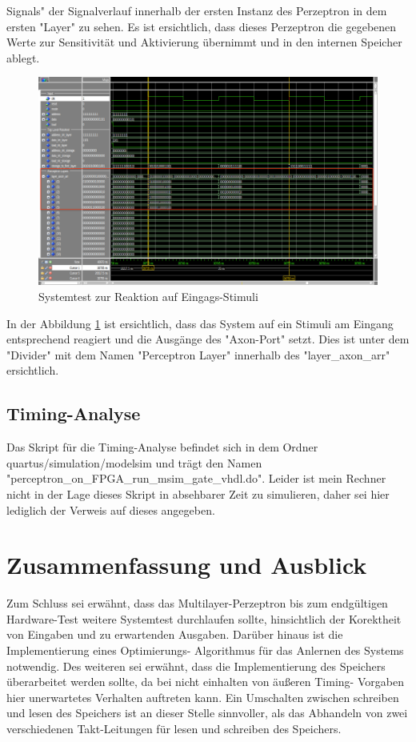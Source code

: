 \documentclass{article}
\numberwithin{equation}{section}
\begin{document}
Signals" der Signalverlauf innerhalb der ersten Instanz des Perzeptron in dem ersten 
"Layer" zu sehen. Es ist ersichtlich, dass dieses Perzeptron die gegebenen Werte 
zur Sensitivität und Aktivierung übernimmt und in den internen Speicher ablegt.
\begin{figure}[htb!]
    \begin{center}
      \includegraphics[width=15cm]{SimulationPictures/top_level_entity_stimulus_sim.png}
    \end{center}
    \caption{Systemtest zur Reaktion auf Eingags-Stimuli} \label{fig:system_stimuli}
  \end{figure}
\FloatBarrier
In der Abbildung \ref{fig:system_stimuli} ist ersichtlich, dass das System auf ein
Stimuli am Eingang entsprechend reagiert und die Ausgänge des "Axon-Port" setzt.
Dies ist unter dem "Divider" mit dem Namen "Perceptron Layer" innerhalb des 
"layer\_axon\_arr" ersichtlich.
\pagebreak
\subsection{Timing-Analyse}
Das Skript für die Timing-Analyse befindet sich in dem Ordner quartus/simulation/modelsim
und trägt den Namen "perceptron\_on\_FPGA\_run\_msim\_gate\_vhdl.do". Leider ist mein Rechner 
nicht in der Lage dieses Skript in absehbarer Zeit zu simulieren, daher sei hier lediglich
der Verweis auf dieses angegeben.

\section{Zusammenfassung und Ausblick}
Zum Schluss sei erwähnt, dass das Multilayer-Perzeptron bis zum endgültigen Hardware-Test 
weitere Systemtest durchlaufen sollte, hinsichtlich der Korektheit von Eingaben und 
zu erwartenden Ausgaben. Darüber hinaus ist die Implementierung eines Optimierungs-
Algorithmus für das Anlernen des Systems notwendig. Des weiteren sei erwähnt, dass die 
Implementierung des Speichers überarbeitet werden sollte, da bei nicht einhalten von 
äußeren Timing- Vorgaben hier unerwartetes Verhalten auftreten kann. Ein Umschalten 
zwischen schreiben und lesen des Speichers ist an dieser Stelle sinnvoller, als das 
Abhandeln von zwei verschiedenen Takt-Leitungen für lesen und schreiben des Speichers.
\end{document}
